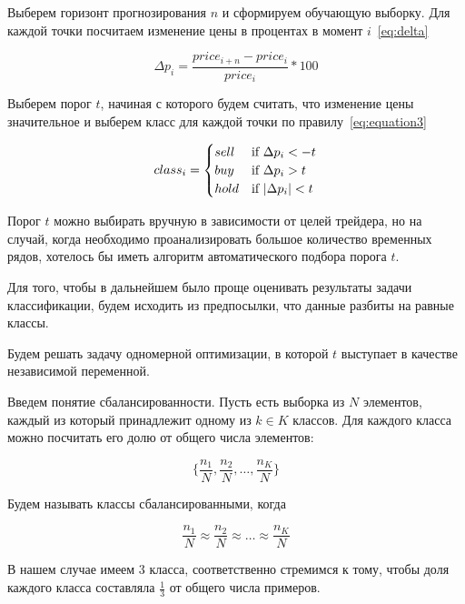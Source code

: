 \documentclass[a4paper,article,14pt]{extarticle}
\begin{document}
Выберем горизонт прогнозирования $n$ и сформируем обучающую выборку.
Для каждой точки посчитаем изменение цены в процентах в момент $i$~\eqref{eq:delta}

\begin{equation}
    \Delta p_i = \frac{price_{i + n} - price_{i}}{price_{i}} * 100
    \label{eq:delta}
\end{equation}

Выберем порог $t$, начиная с которого будем считать, что изменение цены значительное и выберем класс для каждой точки по правилу~\eqref{eq:equation3}

\begin{equation}
class_i =
 \begin{cases}
     sell &\text{if $ \Delta  p_i < -t$}
     \\
     buy &\text{if $\Delta p_i > t$}
     \\
     hold &\text{if $|\Delta p_i| < t$}
 \end{cases}
\label{eq:equation3}
\end{equation}

Порог $t$ можно выбирать вручную в зависимости от целей трейдера, но на случай, когда необходимо проанализировать большое количество временных рядов, хотелось бы иметь алгоритм автоматического подбора порога $t$.
\par
Для того, чтобы в дальнейшем было проще оценивать результаты задачи классификации, будем исходить из предпосылки, что данные разбиты на равные классы.

Будем решать задачу одномерной оптимизации, в которой $t$ выступает в качестве независимой переменной.

Введем понятие сбалансированности.
Пусть есть выборка из $N$ элементов, каждый из который принадлежит одному из $k \in K$ классов.
Для каждого класса можно посчитать его долю от общего числа элементов:

\begin{equation}
    \{ \frac{n_1}{N}, \frac{n_2}{N}, \dots , \frac{n_K}{N} \}
    \label{eq:fractions}
\end{equation}

Будем называть классы сбалансированными, когда

\begin{equation}
    \frac{n_1}{N} \approx \frac{n_2}{N} \approx \dots \approx \frac{n_K}{N}
    \label{eq:balanced}
\end{equation}

В нашем случае имеем 3 класса, соответственно стремимся к тому, чтобы доля каждого класса составляла $\frac{1}{3}$ от общего числа примеров.
\end{document}
